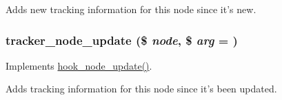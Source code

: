 Adds new tracking information for this node since it's new. \hypertarget{tracker_8module_a3b4c27688afa88c4f96739274091e997}{
\subsubsection[{tracker\_\-node\_\-update}]{\setlength{\rightskip}{0pt plus 5cm}tracker\_\-node\_\-update (\$ {\em node}, \/  \$ {\em arg} = {})}}
\label{tracker_8module_a3b4c27688afa88c4f96739274091e997}
Implements \hyperlink{group__node__api__hooks_gac66c767cc922fcbfdaf17252e5d87d9d}{hook\_\-node\_\-update()}.

Adds tracking information for this node since it's been updated. 